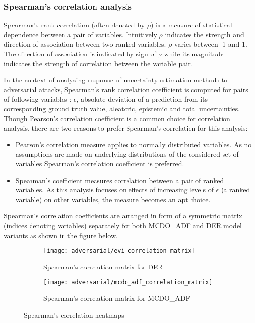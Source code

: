 \subsubsection{Spearman's correlation analysis}

Spearman's rank correlation (often denoted by $\rho$) is a measure of statistical dependence between a pair of variables. Intuitively $\rho$ indicates the strength and direction of association between two ranked variables. $\rho$ varies between -1 and 1. The direction of association is indicated by sign of $\rho$ while its magnitude indicates the strength of correlation between the variable pair.

In the context of analyzing response of uncertainty estimation methods to adversarial attacks, Spearman's rank correlation coefficient is computed for pairs of following variables : $\epsilon$, absolute deviation of a prediction from its corresponding ground truth value, aleatoric, epistemic and total uncertainties. Though Pearson's correlation coefficient is a common choice for correlation analysis, there are two reasons to prefer Spearman's correlation for this analysis:
\begin{itemize}
	\item Pearson's correlation measure applies to normally distributed variables. As no assumptions are made on underlying distributions of the considered set of variables Spearman's correlation coefficient is preferred.
	\item Spearman's coefficient measures correlation between a pair of ranked variables. As this analysis focuses on effects of increasing levels of $\epsilon$ (a ranked variable) on other variables, the measure becomes an apt choice.
\end{itemize} 
Spearman's correlation coefficients are arranged in form of a symmetric matrix (indices denoting variables) separately for both MCDO\_ADF and DER model variants as shown in the figure below.
\begin{figure}[H]
	\begin{subfigure}[b]{0.55\textwidth}
		\texttt{[image: adversarial/evi\_correlation\_matrix]}
		\caption{Spearman's correlation matrix for DER}
		\label{fig:five over x}
	\end{subfigure}
	\hfill
	\begin{subfigure}[b]{0.55\textwidth}
		\texttt{[image: adversarial/mcdo\_adf\_correlation\_matrix]}
		\caption{Spearman's correlation matrix for MCDO\_ADF}
		\label{fig:five over x}
	\end{subfigure}
	\caption{Spearman's correlation heatmaps}
	\label{fig_correlation_analysis}
\end{figure}
